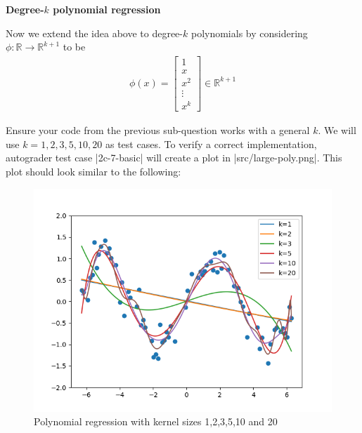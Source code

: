 \item {} {\bf Degree-$k$ polynomial regression}

Now we extend the idea above to degree-$k$ polynomials by considering $\phi:\mathbb{R}\rightarrow \mathbb{R}^{k+1}$ to be 
		\begin{align}
	\phi(x) = \left[\begin{array}{c} 1\\ x \\ x^2\\ \vdots \\x^k \end{array}\right]\in \mathbb{R}^{k+1} \label{eqn:feature-k}
	\end{align}

Ensure your code from the previous sub-question works with a general $k$.  We will use $k=1,2,3,5,10,20$ as test cases. To verify a correct implementation, autograder test case |2c-7-basic| will create a plot in |src/large-poly.png|.  This plot should look similar to the following:
\begin{figure}[H]
  \centering
  \includegraphics[width=0.65\linewidth]{02-featuremaps/large-poly.png}
  \centering
\caption{Polynomial regression with kernel sizes 1,2,3,5,10 and 20}
\end{figure}
